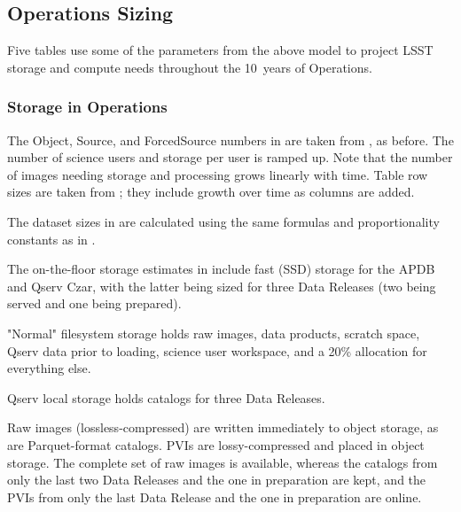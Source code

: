 


\subsection{Operations Sizing}

Five tables use some of the parameters from the above model to project LSST storage and compute needs throughout the 10~years of Operations.

\subsubsection{Storage in Operations}

\afterpage{
  \clearpage
  \begin{landscape}
      
      
  \end{landscape}
  \clearpage
}

The Object, Source, and ForcedSource numbers in  are taken from , as before.
The number of science users and storage per user is ramped up.
Note that the number of images needing storage and processing grows linearly with time.
Table row sizes are taken from ; they include growth over time as columns are added.

The dataset sizes in  are calculated using the same formulas and proportionality constants as in .

\afterpage{
  \clearpage
  \begin{landscape}
      
      
      
  \end{landscape}
  \clearpage
}

The on-the-floor storage estimates in  include fast (SSD) storage for the APDB and Qserv Czar, with the latter being sized for three Data Releases (two being served and one being prepared).

"Normal" filesystem storage holds raw images, data products, scratch space, Qserv data prior to loading, science user workspace, and a 20\% allocation for everything else.

Qserv local storage holds catalogs for three Data Releases.

Raw images (lossless-compressed) are written immediately to object storage, as are Parquet-format catalogs.
PVIs are lossy-compressed and placed in object storage.
The complete set of raw images is available, whereas the catalogs from only the last two Data Releases and the one in preparation are kept, and the PVIs from only the last Data Release and the one in preparation are online.

